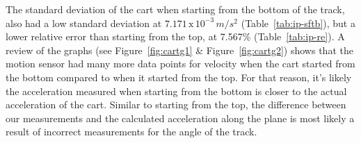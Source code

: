 The standard deviation of the cart when starting from the bottom of the track, also had a low standard deviation at $7.171\,\text{x}\,10^{-3}\,m/s^2$ (Table~\ref{tab:ip-sftb}), but a lower relative error than starting from the top, at 7.567\% (Table~\ref{tab:ip-re}). A review of the graphs (see Figure~\ref{fig:cartg1} & Figure~\ref{fig:cartg2}) shows that the motion sensor had many more data points for velocity when the cart started from the bottom compared to when it started from the top. For that reason, it's likely the acceleration measured when starting from the bottom is closer to the actual acceleration of the cart. Similar to starting from the top, the difference between our measurements and the calculated acceleration along the plane is most likely a result of incorrect measurements for the angle of the track. \par

